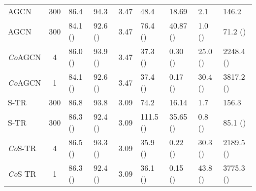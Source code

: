 \documentclass[journal]{IEEEtran}
\theoremstyle{definition}
\begin{document}
\begin{table*}[!tbp]
\begin{center}
{\begin{tabular}{lclllllll}
    \midrule
    AGCN                                & 300   & 86.4  & 94.3  & 3.47   & \phantom{0}48.4  & 18.69     & \phantom{0}2.1   & \phantom{0}146.2 \\
    
    AGCN                            & 300   & 84.1 \textcolor{lred}{()}  & 92.6 \textcolor{lred}{()}  & 3.47        & \phantom{0}76.4 \textcolor{lred}{()}   & 40.87
    \textcolor{lred}{\phantom{00}()}     & \phantom{0}1.0 \textcolor{lred}{\phantom{0}()}     & \phantom{00}71.2 \phantom{0}\textcolor{lred}{()} \\
    
    \textit{Co}AGCN                     & 4     & 86.0 \textcolor{lred}{()} & 93.9 \textcolor{lred}{()} & 3.47     & \phantom{0}37.3 \phantom{0}\textcolor{lgreen}{()}       & \phantom{0}0.30 \textcolor{lgreen}{\phantom{0}()}     & 25.0 \textcolor{lgreen}{()}     & 2248.4 \textcolor{lgreen}{()} \\
    
    \textit{Co}AGCN                 & 1     & 84.1 \textcolor{lred}{()}  & 92.6 \textcolor{lred}{()}  & 3.47   & \phantom{0}37.4 \phantom{0}\textcolor{lgreen}{()}       & \phantom{0}0.17 \textcolor{lgreen}{()}      & 30.4 \textcolor{lgreen}{()}     & 3817.2 \textcolor{lgreen}{()} \\
    
    \midrule
    S-TR                                & 300   & 86.8     & 93.8     & 3.09    & \phantom{0}74.2      & 16.14         & \phantom{0}1.7     & \phantom{0}156.3 \\
    
    S-TR                            & 300   & 86.3 \textcolor{lred}{()}      & 92.4 \textcolor{lred}{()}     & 3.09    & 111.5 \textcolor{lred}{()}      & 35.65 \textcolor{lred}{\phantom{00}()}        & \phantom{0}0.8 \textcolor{lred}{\phantom{0}()}     & \phantom{00}85.1 \phantom{0}\textcolor{lred}{()} \\
    
    \textit{Co}S-TR                     & 4     & 86.5 \textcolor{lred}{()}     & 93.3 \textcolor{lred}{()}      & 3.09    & \phantom{0}35.9 \phantom{0}\textcolor{lgreen}{()}      & \phantom{0}0.22 \textcolor{lgreen}{\phantom{0}()}         & 30.3 \textcolor{lgreen}{()}     & 2189.5 \textcolor{lgreen}{()} \\
    
    \textit{Co}S-TR                 & 1     & 86.3 \textcolor{lred}{()}     & 92.4 \textcolor{lred}{()}     & 3.09   & \phantom{0}36.1 \phantom{0}\textcolor{lgreen}{()}       & \phantom{0}0.15 \textcolor{lgreen}{()}         & 43.8 \textcolor{lgreen}{()}     & 3775.3 \textcolor{lgreen}{()} \\
    
    \bottomrule
\end{tabular}
}
\end{center}
\end{table*}
\end{document}

